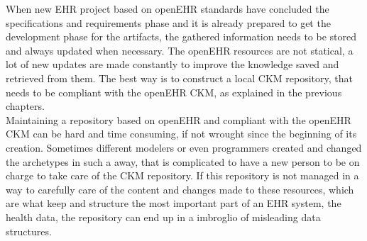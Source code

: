 \documentclass[mim_thesis.tex]{subfiles}
\begin{document}
When new EHR project based on openEHR standards have concluded the specifications and requirements phase and it is already prepared to get the development phase for the artifacts, the gathered information needs to be stored and always updated when necessary. The openEHR resources are not statical, a lot of new updates are made constantly to improve the knowledge saved and retrieved from them. The best way is to construct a local CKM repository, that needs to be compliant with the openEHR CKM, as explained in the previous chapters. \\ 

Maintaining a repository based on openEHR and compliant with the openEHR CKM can be hard and time consuming, if not wrought since the beginning of its creation. Sometimes different modelers or even programmers created and changed the archetypes in such a away, that is complicated to have a new person to be on charge to take care of the CKM repository. If this repository is not managed in a way to carefully care of the content and changes made to these resources, which are what keep and structure the most important part of an EHR system, the health data, the repository can end up in a imbroglio of misleading data structures. \\
\end{document}

